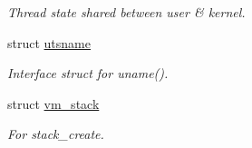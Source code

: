 \begin{DoxyCompactItemize}
\begin{DoxyCompactList}\small\item\em Thread state shared between user \& kernel. \item\end{DoxyCompactList}\item 
struct \hyperlink{structTru64_1_1utsname}{utsname}
\begin{DoxyCompactList}\small\item\em Interface struct for uname(). \item\end{DoxyCompactList}\item 
struct \hyperlink{structTru64_1_1vm__stack}{vm\_\-stack}
\begin{DoxyCompactList}\small\item\em For stack\_\-create. \item\end{DoxyCompactList}\end{DoxyCompactItemize}
